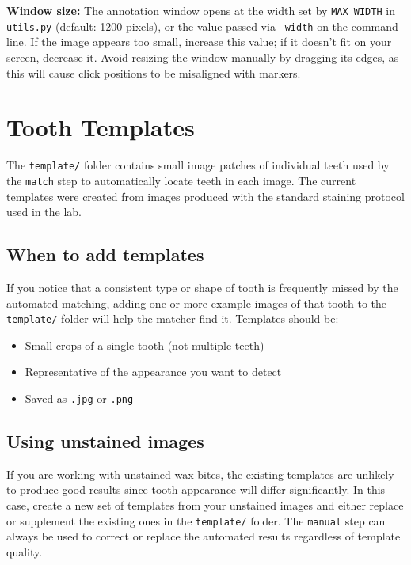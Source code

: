 \documentclass[11pt, letterpaper]{article}
\begin{document}
\begin{tipbox}
\textbf{Window size:} The annotation window opens at the width set by \texttt{MAX\_WIDTH}
in \texttt{utils.py} (default: 1200 pixels), or the value passed via \texttt{--width} on
the command line. If the image appears too small, increase this value; if it doesn't fit
on your screen, decrease it. Avoid resizing the window manually by dragging its edges, as
this will cause click positions to be misaligned with markers.
\end{tipbox}

\section{Tooth Templates}

The \texttt{template/} folder contains small image patches of individual teeth used
by the \texttt{match} step to automatically locate teeth in each image. The current
templates were created from images produced with the standard staining protocol used
in the lab.

\subsection*{When to add templates}

If you notice that a consistent type or shape of tooth is frequently missed by the
automated matching, adding one or more example images of that tooth to the
\texttt{template/} folder will help the matcher find it. Templates should be:

\begin{itemize}[leftmargin=*]
  \item Small crops of a single tooth (not multiple teeth)
  \item Representative of the appearance you want to detect
  \item Saved as \texttt{.jpg} or \texttt{.png}
\end{itemize}

\subsection*{Using unstained images}

If you are working with unstained wax bites, the existing templates are unlikely to
produce good results since tooth appearance will differ significantly. In this case,
create a new set of templates from your unstained images and either replace or
supplement the existing ones in the \texttt{template/} folder. The \texttt{manual}
step can always be used to correct or replace the automated results regardless of
template quality.
\end{document}
